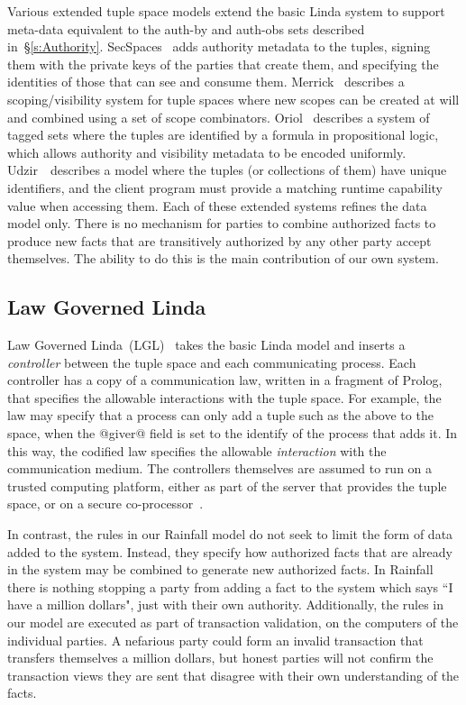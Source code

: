 Various extended tuple space models extend the basic Linda system to support meta-data equivalent to the auth-by and auth-obs sets described in~\S\ref{s:Authority}. SecSpaces~\cite{Busi2003:SecSpaces} adds authority metadata to the tuples, signing them with the private keys of the parties that create them, and specifying the identities of those that can see and consume them. Merrick~\cite{Merrick2000:Scopes} describes a scoping/visibility system for tuple spaces where new scopes can be created at will and combined using a set of scope combinators. Oriol~\cite{Oriol2005:TaggedSets} describes a system of tagged sets where the tuples are identified by a formula in propositional logic, which allows authority and visibility metadata to be encoded uniformly. Udzir~\cite{Udzir2007:MultiCapabilities}~describes a model where the tuples (or collections of them) have unique identifiers, and the client program must provide a matching runtime capability value when accessing them. Each of these extended systems refines the data model only. There is no mechanism for parties to combine authorized facts to produce new facts that are transitively authorized by any other party accept themselves. The ability to do this is the main contribution of our own system.


\subsection{Law Governed Linda}
Law Governed Linda~(LGL)~\cite{Minsky1994:LawGovernedLinda, Minsky2001:SafeTupleSpace} takes the basic Linda model and inserts a \emph{controller} between the tuple space and each communicating process. Each controller has a copy of a communication law, written in a fragment of Prolog, that specifies the allowable interactions with the tuple space. For example, the law may specify that a process can only add a tuple such as the above to the space, when the @giver@ field is set to the identify of the process that adds it. In this way, the codified law specifies the allowable \emph{interaction} with the communication medium. The controllers themselves are assumed to run on a trusted computing platform, either as part of the server that provides the tuple space, or on a secure co-processor~\cite{Minsky2001:SafeTupleSpace}.

In contrast, the rules in our Rainfall model do not seek to limit the form of data added to the system. Instead, they specify how authorized facts that are already in the system may be combined to generate new authorized facts. In Rainfall there is nothing stopping a party from adding a fact to the system which says ``I have a million dollars", just with their own authority. Additionally, the rules in our model are executed as part of transaction validation, on the computers of the individual parties. A nefarious party could form an invalid transaction that transfers themselves a million dollars, but honest parties will not confirm the transaction views they are sent that disagree with their own understanding of the facts.


